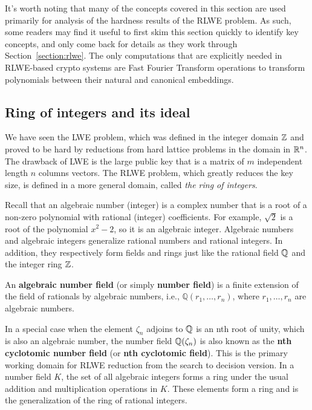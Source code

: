 \documentclass[../main.tex]{subfiles}
\begin{document}
It's worth noting that many of the concepts covered in this section are used primarily for analysis of the hardness results of the RLWE problem. As such, some readers may find it useful to first skim this section quickly to identify key concepts, and only come back for details as they work through Section~\ref{section:rlwe}.
The only computations that are explicitly needed in RLWE-based crypto systems are Fast Fourier Transform operations to transform polynomials between their natural and canonical embeddings. 


\subsection{Ring of integers and its ideal}
\label{subsection:number field}


We have seen the LWE problem, which was defined in the integer domain $\mathbb{Z}$ and proved to be hard by reductions from hard lattice problems in the domain in $\mathbb{R}^n$. The drawback of LWE is the large public key that is a matrix of $m$ independent length $n$ columns vectors. The RLWE problem, which greatly reduces the key size, is defined in a more general domain, called \textit{the ring of integers}.    

Recall that an algebraic number (integer) is a complex number that is a root of a non-zero polynomial with rational (integer) coefficients. For example, $\sqrt{2}$ is a root of the polynomial $x^2-2$, so it is an algebraic integer. Algebraic numbers and algebraic integers generalize rational numbers and rational integers. In addition, they respectively form fields and rings just like the rational field $\mathbb{Q}$ and the integer ring $\mathbb{Z}$. 

\begin{definition}
\reversemarginpar
{}
An \textbf{algebraic number field} (or simply \textbf{number field}) is a finite extension of the field of rationals by algebraic numbers, i.e., $\mathbb{Q}(r_1, \dots, r_n)$, where $r_1, \dots, r_n$ are algebraic numbers.
\end{definition}

In a special case when the element $\zeta_n$ adjoins to $\mathbb{Q}$ is an nth root of unity, which is also an algebraic number, the number field $\mathbb{Q}(\zeta_n)$ is also known as the  
\reversemarginpar
{}
\textbf{nth cyclotomic number field} (or \textbf{nth cyclotomic field}). This is the primary working domain for RLWE reduction from the search to decision version. 
In a number field $K$, the set of all algebraic integers forms a ring under the usual addition and multiplication operations in $K$. These elements form a ring and is the generalization of the ring of rational integers. 
\end{document}
